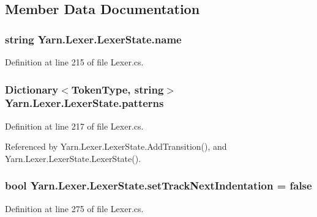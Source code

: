 \subsection{Member Data Documentation}
\hypertarget{a00122_aeb8debd0d81a76e90f083f0bf407573e}{
\subsubsection[{name}]{\setlength{\rightskip}{0pt plus 5cm}string Yarn.\-Lexer.\-Lexer\-State.\-name}}\label{a00122_aeb8debd0d81a76e90f083f0bf407573e}


Definition at line 215 of file Lexer.\-cs.

\hypertarget{a00122_a951f91e9522ffe84851f2e25e9445106}{
\subsubsection[{patterns}]{\setlength{\rightskip}{0pt plus 5cm}Dictionary$<${\bf Token\-Type}, string$>$ Yarn.\-Lexer.\-Lexer\-State.\-patterns\hspace{0.3cm}{\ttfamily [private]}}}\label{a00122_a951f91e9522ffe84851f2e25e9445106}


Definition at line 217 of file Lexer.\-cs.



Referenced by Yarn.\-Lexer.\-Lexer\-State.\-Add\-Transition(), and Yarn.\-Lexer.\-Lexer\-State.\-Lexer\-State().

\hypertarget{a00122_ad8b6ccac53bedd9dc202ffe6ac5698b2}{
\subsubsection[{set\-Track\-Next\-Indentation}]{\setlength{\rightskip}{0pt plus 5cm}bool Yarn.\-Lexer.\-Lexer\-State.\-set\-Track\-Next\-Indentation = false}}\label{a00122_ad8b6ccac53bedd9dc202ffe6ac5698b2}


Definition at line 275 of file Lexer.\-cs.



